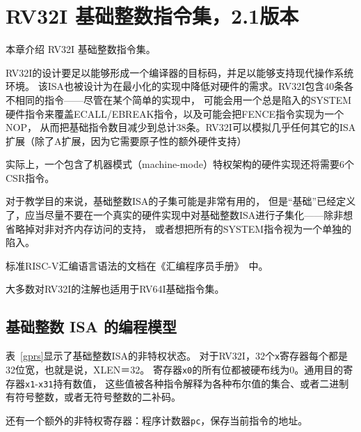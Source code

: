 \chapter{RV32I 基础整数指令集，2.1版本}
\label{rv32}

本章介绍 RV32I 基础整数指令集。

\begin{commentary}

  RV32I的设计要足以能够形成一个编译器的目标码，并足以能够支持现代操作系统环境。
  该ISA也被设计为在最小化的实现中降低对硬件的需求。RV32I包含40条各不相同的指令——尽管在某个简单的实现中，
  可能会用一个总是陷入的SYSTEM硬件指令来覆盖ECALL/EBREAK指令，以及可能会把FENCE指令实现为一个NOP，
  从而把基础指令数目减少到总计38条。RV32I可以模拟几乎任何其它的ISA扩展（除了A扩展，因为它需要原子性的额外硬件支持）

  实际上，一个包含了机器模式（machine-mode）特权架构的硬件实现还将需要6个CSR指令。

  对于教学目的来说，基础整数ISA的子集可能是非常有用的，
  但是“基础”已经定义了，应当尽量不要在一个真实的硬件实现中对基础整数ISA进行子集化——除非想省略掉对非对齐内存访问的支持，
  或者想把所有的SYSTEM指令视为一个单独的陷入。
\end{commentary}

\begin{commentary}

标准RISC-V汇编语言语法的文档在《汇编程序员手册》~\cite{riscv-asm-manual}中。
\end{commentary}

\begin{commentary}

大多数对RV32I的注解也适用于RV64I基础指令集。
\end{commentary}

\section{基础整数 ISA 的编程模型}

表~\ref{gprs}显示了基础整数ISA的非特权状态。
对于RV32I，32个{\tt x}寄存器每个都是32位宽，也就是说，XLEN＝32。
寄存器{\tt x0}的所有位都被硬布线为0。通用目的寄存器{\tt x1}-{\tt x31}持有数值，
这些值被各种指令解释为各种布尔值的集合、或者二进制有符号整数，或者无符号整数的二补码。

还有一个额外的非特权寄存器：程序计数器{\tt pc}，保存当前指令的地址。

